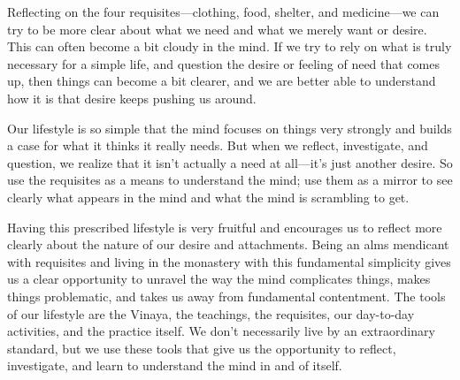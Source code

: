 
Reflecting on the four requisites---clothing, food, shelter, and 
medicine---we can try to be more clear about what we need and what we 
merely want or desire. This can often become a bit cloudy in the mind. 
If we try to rely on what is truly necessary for a simple life, and 
question the desire or feeling of need that comes up, then things can 
become a bit clearer, and we are better able to understand how it is 
that desire keeps pushing us around.

Our lifestyle is so simple that the mind focuses on things very 
strongly and builds a case for what it thinks it really needs. But when 
we reflect, investigate, and question, we realize that it isn't 
actually a need at all---it's just another desire. So use the 
requisites as a means to understand the mind; use them as a mirror to 
see clearly what appears in the mind and what the mind is scrambling to 
get.

Having this prescribed lifestyle is very fruitful and encourages us to 
reflect more clearly about the nature of our desire and attachments. 
Being an alms mendicant with requisites and living in the monastery 
with this fundamental simplicity gives us a clear opportunity to 
unravel the way the mind complicates things, makes things problematic, 
and takes us away from fundamental contentment. The tools of our 
lifestyle are the Vinaya, the teachings, the requisites, our day-to-day 
activities, and the practice itself. We don't necessarily live by an 
extraordinary standard, but we use these tools that give us the 
opportunity to reflect, investigate, and learn to understand the mind 
in and of itself.


